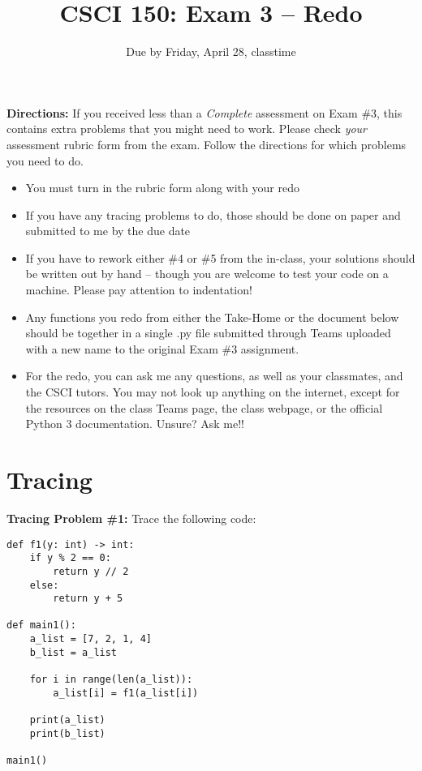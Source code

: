 \documentclass{article}
\begin{document}
\title{CSCI 150: Exam 3 -- Redo}
\author{}
\date{Due by Friday, April 28, classtime}

\maketitle

\thispagestyle{empty}

\textbf{Directions:} If you received less than a \emph{Complete} assessment on Exam \#3, this contains extra problems that you might need to work. Please check \emph{your} assessment rubric form from the exam. Follow the directions for which problems you need to do.

\begin{itemize}
  \item You must turn in the rubric form along with your redo
  \item If you have any tracing problems to do, those should be done on paper and submitted to me by the due date
  \item If you have to rework either \#4 or \#5 from the in-class, your solutions should be written out by hand -- though you are welcome to test your code on a machine. Please pay attention to indentation!
  \item Any functions you redo from either the Take-Home or the document below should be together in a single .py file submitted through Teams uploaded with a new name to the original Exam \#3 assignment.
  \item For the redo, you can ask me any questions, as well as your classmates, and the CSCI tutors. You may not look up anything on the internet, except for the resources on the class Teams page, the class webpage, or the official Python 3 documentation. Unsure? Ask me!!
\end{itemize}


  \vspace{0.3in}





\newpage

\section*{Tracing}

\textbf{Tracing Problem \#1:}  Trace the following code:

\vspace{0.15in}

\begin{verbatim}
def f1(y: int) -> int:
    if y % 2 == 0:
        return y // 2
    else:
        return y + 5

def main1():
    a_list = [7, 2, 1, 4]
    b_list = a_list

    for i in range(len(a_list)):
        a_list[i] = f1(a_list[i])

    print(a_list)
    print(b_list)

main1()
\end{verbatim}
\end{document}
